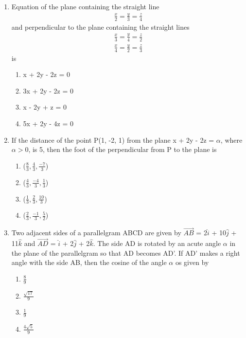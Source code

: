 \begin{enumerate}[label=\arabic*.,ref=\thesubsection.\theenumi]
\item Equation of the plane containing the straight line 
\begin{align*}
\frac{x}{2} = \frac{y}{3} = \frac{z}{4}
\end{align*}
and perpendicular to the plane containing the straight lines 
\begin{align*}
\frac{x}{3} = \frac{y}{4} = \frac{z}{2} 
\end{align*}
\begin{align*}
\frac{x}{4} = \frac{y}{2} = \frac{z}{3}
\end{align*}
is
\begin{enumerate}
\item x + 2y - 2z = 0
\item 3x + 2y - 2z = 0
\item x - 2y + z = 0
\item 5x + 2y - 4z = 0
\end{enumerate}

\item If the distance of the point P(1, -2, 1) from the plane x + 2y - 2z = $\alpha$, where $\alpha > 0$, is 5, then the foot of the perpendicular from P to the plane is
\begin{enumerate}
\item ($\frac{8}{3}, \frac{4}{3}, \frac{-7}{3}$)
\item ($\frac{4}{3}, \frac{-4}{3}, \frac{1}{3}$)
\item ($\frac{1}{3}, \frac{2}{3}, \frac{10}{3}$)
\item ($\frac{2}{3}, \frac{-1}{3}, \frac{5}{2}$)
\end{enumerate}

\item Two adjacent sides of a parallelgram ABCD are given by $\overrightarrow{AB}$ = 2$\hat{i}$ + 10$\hat{j}$ + 11$\hat{k}$ and $\overrightarrow{AD}$ = $\hat{i}$ + 2$\hat{j}$ + 2$\hat{k}$. The side AD is rotated by an acute angle $\alpha$ in the plane of the parallelgram so that AD becomes AD'. If AD' makes a right angle with the side AB, then the cosine of the angle $\alpha$ os given by
\begin{enumerate}
\item $\frac{8}{9}$
\item $\frac{\sqrt{17}}{9}$
\item $\frac{1}{9}$
\item $\frac{4\sqrt{5}}{9}$
\end{enumerate}


\end{enumerate}
